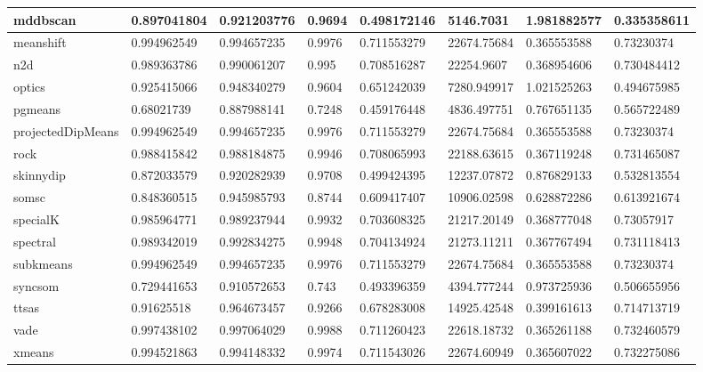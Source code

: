 \begin{table}[H]
\begin{tabular}{|l|l|l|l|l|l|l|l|}
\hline
mddbscan & 0.897041804 & 0.921203776 & 0.9694 & 0.498172146 & 5146.7031 & 1.981882577 & 0.335358611 \\
\hline
meanshift & 0.994962549 & 0.994657235 & 0.9976 & 0.711553279 & 22674.75684 & 0.365553588 & 0.73230374 \\
\hline
n2d & 0.989363786 & 0.990061207 & 0.995 & 0.708516287 & 22254.9607 & 0.368954606 & 0.730484412 \\
\hline
optics & 0.925415066 & 0.948340279 & 0.9604 & 0.651242039 & 7280.949917 & 1.021525263 & 0.494675985 \\
\hline
pgmeans & 0.68021739 & 0.887988141 & 0.7248 & 0.459176448 & 4836.497751 & 0.767651135 & 0.565722489 \\
\hline
projectedDipMeans & 0.994962549 & 0.994657235 & 0.9976 & 0.711553279 & 22674.75684 & 0.365553588 & 0.73230374 \\
\hline
rock & 0.988415842 & 0.988184875 & 0.9946 & 0.708065993 & 22188.63615 & 0.367119248 & 0.731465087 \\
\hline
skinnydip & 0.872033579 & 0.920282939 & 0.9708 & 0.499424395 & 12237.07872 & 0.876829133 & 0.532813554 \\
\hline
somsc & 0.848360515 & 0.945985793 & 0.8744 & 0.609417407 & 10906.02598 & 0.628872286 & 0.613921674 \\
\hline
specialK & 0.985964771 & 0.989237944 & 0.9932 & 0.703608325 & 21217.20149 & 0.368777048 & 0.73057917 \\
\hline
spectral & 0.989342019 & 0.992834275 & 0.9948 & 0.704134924 & 21273.11211 & 0.367767494 & 0.731118413 \\
\hline
subkmeans & 0.994962549 & 0.994657235 & 0.9976 & 0.711553279 & 22674.75684 & 0.365553588 & 0.73230374 \\
\hline
syncsom & 0.729441653 & 0.910572653 & 0.743 & 0.493396359 & 4394.777244 & 0.973725936 & 0.506655956 \\
\hline
ttsas & 0.91625518 & 0.964673457 & 0.9266 & 0.678283008 & 14925.42548 & 0.399161613 & 0.714713719 \\
\hline
vade & 0.997438102 & 0.997064029 & 0.9988 & 0.711260423 & 22618.18732 & 0.365261188 & 0.732460579 \\
\hline
xmeans & 0.994521863 & 0.994148332 & 0.9974 & 0.711543026 & 22674.60949 & 0.365607022 & 0.732275086 \\
\hline
\end{tabular}
\end{table}